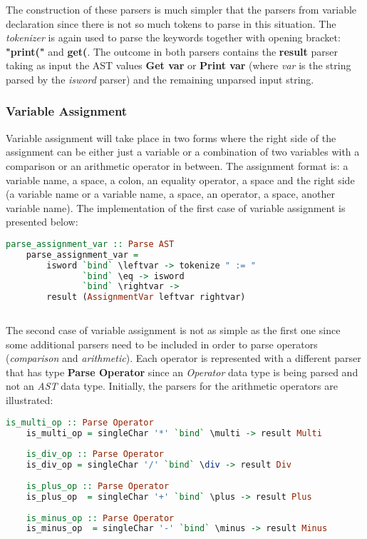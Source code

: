 \documentclass[a4paper, onecolumn]{article}
\begin{document}
    \noindent The construction of these parsers is much simpler that the parsers from variable declaration since there is not so much tokens to parse in this situation. The \textit{tokenizer} is again used to parse the keywords together with opening bracket: \textbf{"print("} and \textbf{get(}. The outcome in both parsers contains the \textbf{result} parser taking as input the AST values \textbf{Get var} or \textbf{Print var} (where \textit{var} is the string parsed by the \textit{isword} parser) and the remaining unparsed input string.
    
    
    \subsubsection{Variable Assignment}
    
    Variable assignment will take place in two forms where the right side of the assignment can be either just a variable or a combination of two variables with a comparison or an arithmetic operator in between. The assignment format is: a variable name, a space, a colon, an equality operator, a space and the right side (a variable name or a variable name, a space, an operator, a space, another variable name). The implementation of the first case of variable assignment is presented below:  
    
    \begin{tcolorbox}
    \begin{lstlisting}[language=Haskell] 
    parse_assignment_var :: Parse AST
    parse_assignment_var = 
        isword `bind` \leftvar -> tokenize " := " 
               `bind` \eq -> isword 
               `bind` \rightvar -> 
        result (AssignmentVar leftvar rightvar) 
     
     \end{lstlisting}
    \end{tcolorbox}
    
    \noindent The second case of variable assignment is not as simple as the first one since some additional parsers need to be included in order to parse operators (\textit{comparison} and \textit{arithmetic}). Each operator is represented with a different parser that has type \textbf{Parse Operator} since an \textit{Operator} data type is being parsed and not an \textit{AST} data type. Initially, the parsers for the arithmetic operators are illustrated: 
    
    \begin{tcolorbox}
    \begin{lstlisting}[language=Haskell] 
    is_multi_op :: Parse Operator
    is_multi_op = singleChar '*' `bind` \multi -> result Multi
    
    is_div_op :: Parse Operator
    is_div_op = singleChar '/' `bind` \div -> result Div
    
    is_plus_op :: Parse Operator
    is_plus_op  = singleChar '+' `bind` \plus -> result Plus
    
    is_minus_op :: Parse Operator
    is_minus_op  = singleChar '-' `bind` \minus -> result Minus
    \end{lstlisting}
    \end{tcolorbox}
    
\end{document}

